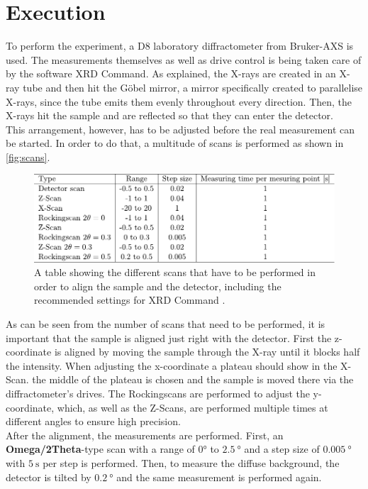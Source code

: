 \section{Execution}
\label{sec:execution}

To perform the experiment, a D8 laboratory diffractometer from Bruker-AXS is used.
The measurements themselves as well as drive control is being taken care of by the software XRD Command.
As explained, the X-rays are created in an X-ray tube and then hit the Göbel mirror, 
a mirror specifically created to parallelise X-rays, since the tube emits them evenly throughout every direction.
Then, the X-rays hit the sample and are reflected so that they can enter the detector. \\

This arrangement, however, has to be adjusted before the real measurement can be started.
In order to do that, a multitude of scans is performed as shown in \autoref{fig:scans}.

\begin{figure}[H]
    \centering
    \includegraphics{figures/scans.pdf}
    \caption{A table showing the different scans that have to be performed in order to align the sample and the detector, 
    including the recommended settings for XRD Command \cite{v44}.}
    \label{fig:scans}
\end{figure}

As can be seen from the number of scans that need to be performed, it is important that the sample is aligned just right with the detector.
First the z-coordinate is aligned by moving the sample through the X-ray until it blocks half the intensity.
When adjusting the x-coordinate a plateau should show in the X-Scan.
the middle of the plateau is chosen and the sample is moved there via the diffractometer's drives.
The Rockingscans are performed to adjust the y-coordinate, which, as well as the Z-Scans, are performed multiple times at
different angles to ensure high precision. \\

After the alignment, the measurements are performed.
First, an \textbf{Omega/2Theta}-type scan with a range of $0°$ to $\SI{2.5}{\degree}$ and a step size of $\SI{0.005}{\degree}$ with $\SI{5}{\second}$ per step is performed.
Then, to measure the diffuse background, the detector is tilted by $\SI{0.2}{\degree}$ and the same measurement is performed again.


